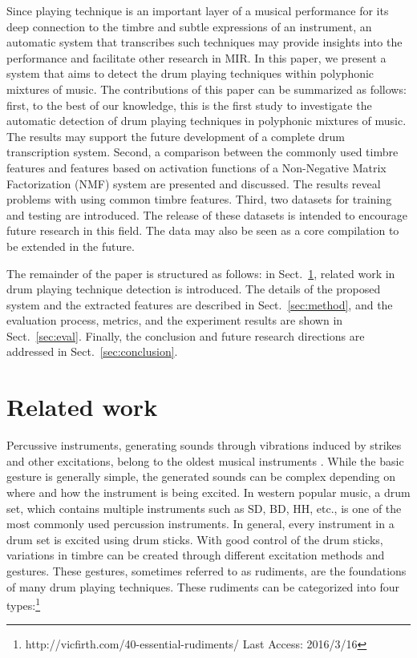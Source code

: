 \documentclass{article}
\begin{document}
Since playing technique is an important layer of a musical performance for its deep connection to the timbre and subtle expressions of an instrument, an automatic system that transcribes such techniques may provide insights into the performance and facilitate other research in MIR. In this paper, we present a system that aims to detect the drum playing techniques within polyphonic mixtures of music. 
The contributions of this paper can be summarized as follows: first, to the best of our knowledge, this is the first study to investigate the automatic detection of drum playing techniques in polyphonic mixtures of music. The results may support the future development of a complete drum transcription system. Second, a comparison between the commonly used timbre features and features based on activation functions of a Non-Negative Matrix Factorization (NMF) system are presented and discussed. The results reveal problems with using common timbre features. Third, two datasets for training and testing are introduced. The release of these datasets is intended to encourage future research in this field. The data may also be seen as a core compilation to be extended in the future.

The remainder of the paper is structured as follows: in Sect.~\ref{sec:related_work}, related work in drum playing technique detection is introduced. The details of the proposed system and the extracted features are described in Sect.~\ref{sec:method}, and the evaluation process, metrics, and the experiment results are shown in Sect.~\ref{sec:eval}. Finally, the conclusion and future research directions are addressed in Sect.~\ref{sec:conclusion}. 


%
\section{Related work}\label{sec:related_work}
Percussive instruments, generating sounds through vibrations induced by strikes and other excitations, belong to the oldest musical instruments \cite{Rossing2001}. While the basic gesture is generally simple, the generated sounds can be complex depending on where and how the instrument is being excited. In western popular music, a drum set, which contains multiple instruments such as SD, BD, HH, etc., is one of the most commonly used percussion instruments. In general, every instrument in a drum set is excited using drum sticks. With good control of the drum sticks, variations in timbre can be created through different excitation methods and gestures\cite{Stone2009}. These gestures, sometimes referred to as rudiments, are the foundations of many drum playing techniques. These rudiments can be categorized into four types:\footnote{http://vicfirth.com/40-essential-rudiments/ Last Access: 2016/3/16}
\end{document}
